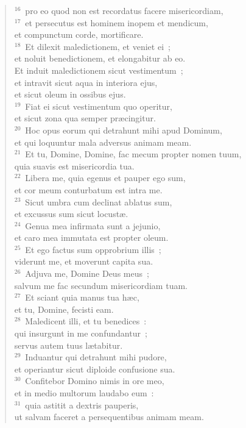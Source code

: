 \begin{flushleft}
\begin{verse}
${}^{16}$~pro eo quod non est recordatus facere misericordiam,\\
${}^{17}$~et persecutus est hominem inopem et mendicum,\\ et compunctum corde, mortificare.\\
${}^{18}$~Et dilexit maledictionem, et veniet ei~;\\ et noluit benedictionem, et elongabitur ab eo.\\ Et induit maledictionem sicut vestimentum~;\\ et intravit sicut aqua in interiora ejus,\\ et sicut oleum in ossibus ejus.\\
${}^{19}$~Fiat ei sicut vestimentum quo operitur,\\ et sicut zona qua semper pr\ae cingitur.\\
${}^{20}$~Hoc opus eorum qui detrahunt mihi apud Dominum,\\ et qui loquuntur mala adversus animam meam.\\
${}^{21}$~Et tu, Domine, Domine, fac mecum propter nomen tuum,\\ quia suavis est misericordia tua.\\
${}^{22}$~Libera me, quia egenus et pauper ego sum,\\ et cor meum conturbatum est intra me.\\
${}^{23}$~Sicut umbra cum declinat ablatus sum,\\ et excussus sum sicut locust\ae .\\
${}^{24}$~Genua mea infirmata sunt a jejunio,\\ et caro mea immutata est propter oleum.\\
${}^{25}$~Et ego factus sum opprobrium illis~;\\ viderunt me, et moverunt capita sua.\\
${}^{26}$~Adjuva me, Domine Deus meus~;\\ salvum me fac secundum misericordiam tuam.\\
${}^{27}$~Et sciant quia manus tua h\ae c,\\ et tu, Domine, fecisti eam.\\
${}^{28}$~Maledicent illi, et tu benedices~:\\ qui insurgunt in me confundantur~;\\ servus autem tuus l\ae tabitur.\\
${}^{29}$~Induantur qui detrahunt mihi pudore,\\ et operiantur sicut diploide confusione sua.\\
${}^{30}$~Confitebor Domino nimis in ore meo,\\ et in medio multorum laudabo eum~:\\
${}^{31}$~quia astitit a dextris pauperis,\\ ut salvam faceret a persequentibus animam meam.\end{verse}\end{flushleft}


